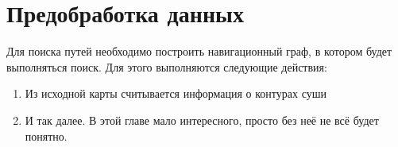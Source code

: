 \chapter{Предобработка данных}

\FloatBarrier

Для поиска путей необходимо построить навигационный граф, в котором
будет выполняться поиск. Для этого выполняются следующие действия:

\begin{enumerate}
    \item Из исходной карты считывается информация о контурах суши
    \item И так далее. В этой главе мало интересного, просто без неё
      не всё будет понятно.
\end{enumerate}

\FloatBarrier

